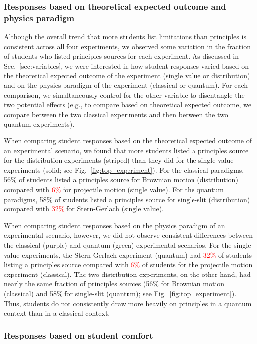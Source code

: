 \documentclass[english,aps,prstper,reprint,showpacs,longbibliography,superscriptaddress,nofootinbib]{revtex4-2}
\begin{document}
\subsubsection{Responses based on theoretical expected outcome and physics paradigm}

Although the overall trend that more students list limitations than principles is consistent across all four experiments, we observed some variation in the fraction of students who listed principles sources for each experiment. As discussed in Sec.~\ref{sec:variables}, we were interested in how student responses varied based on the theoretical expected outcome of the experiment (single value or distribution) and on the physics paradigm of the experiment (classical or quantum). For each comparison, we simultaneously control for the other variable to disentangle the two potential effects (e.g., to compare based on theoretical expected outcome, we compare between the two classical experiments and then between the two quantum experiments).

When comparing student responses based on the theoretical expected outcome of an experimental scenario, we found that more students listed a principles source for the distribution experiments (striped) than they did for the single-value experiments (solid; see Fig.~\ref{fig:top_experiment}).  For the classical paradigms, 56\% of students listed a principles source for Brownian motion (distribution) compared with \textcolor{red}{6\%} for projectile motion (single value). For the quantum paradigms, 58\% of students listed a principles source for single-slit (distribution) compared with \textcolor{red}{32\%} for Stern-Gerlach (single value). 

When comparing student responses based on the physics paradigm of an experimental scenario, however, we did not observe consistent differences between the classical (purple) and quantum (green) experimental scenarios. For the single-value experiments, the Stern-Gerlach experiment (quantum) had \textcolor{red}{32\%} of students listing a principles source compared with \textcolor{red}{6\%} of students for the projectile motion experiment (classical). The two distribution experiments, on the other hand, had nearly the same fraction of principles sources (56\% for Brownian motion (classical) and 58\% for single-slit (quantum); see Fig.~\ref{fig:top_experiment}). Thus, students do not consistently draw more heavily on principles in a quantum context than in a classical context.

\subsubsection{Responses based on student comfort}
\end{document}
